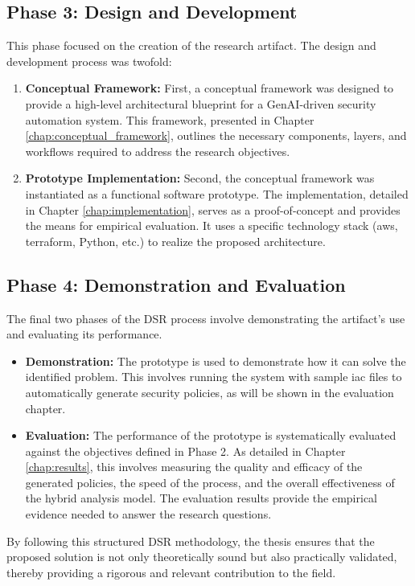 \subsection{Phase 3: Design and Development}
\label{subsec:design_development}
This phase focused on the creation of the research artifact. The design and development process was twofold:
\begin{enumerate}
    \item \textbf{Conceptual Framework:} First, a conceptual framework was designed to provide a high-level architectural blueprint for a GenAI-driven security automation system. This framework, presented in Chapter \ref{chap:conceptual_framework}, outlines the necessary components, layers, and workflows required to address the research objectives.
    \item \textbf{Prototype Implementation:} Second, the conceptual framework was instantiated as a functional software prototype. The implementation, detailed in Chapter \ref{chap:implementation}, serves as a proof-of-concept and provides the means for empirical evaluation. It uses a specific technology stack (\gls{aws}, \gls{terraform}, Python, etc.) to realize the proposed architecture.
\end{enumerate}

\subsection{Phase 4: Demonstration and Evaluation}
\label{subsec:demonstration_evaluation}
The final two phases of the DSR process involve demonstrating the artifact's use and evaluating its performance.
\begin{itemize}
    \item \textbf{Demonstration:} The prototype is used to demonstrate how it can solve the identified problem. This involves running the system with sample \gls{iac} files to automatically generate security policies, as will be shown in the evaluation chapter.
    \item \textbf{Evaluation:} The performance of the prototype is systematically evaluated against the objectives defined in Phase 2. As detailed in Chapter \ref{chap:results}, this involves measuring the quality and efficacy of the generated policies, the speed of the process, and the overall effectiveness of the hybrid analysis model. The evaluation results provide the empirical evidence needed to answer the research questions.
\end{itemize}

By following this structured DSR methodology, the thesis ensures that the proposed solution is not only theoretically sound but also practically validated, thereby providing a rigorous and relevant contribution to the field.
